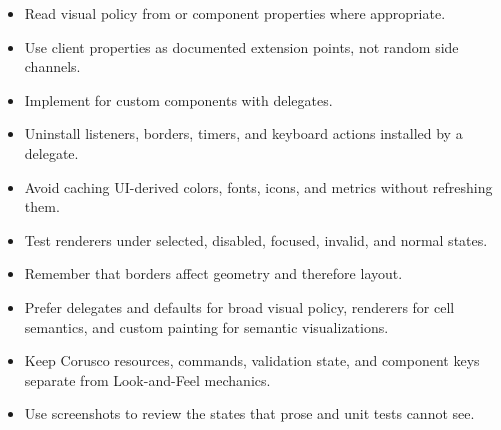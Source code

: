 \begin{itemize}
\item Read visual policy from  or component properties where appropriate.
\item Use client properties as documented extension points, not random side channels.
\item Implement  for custom components with delegates.
\item Uninstall listeners, borders, timers, and keyboard actions installed by a delegate.
\item Avoid caching UI-derived colors, fonts, icons, and metrics without refreshing them.
\item Test renderers under selected, disabled, focused, invalid, and normal states.
\item Remember that borders affect geometry and therefore layout.
\item Prefer delegates and defaults for broad visual policy, renderers for cell semantics, and custom painting for semantic visualizations.
\item Keep Corusco resources, commands, validation state, and component keys separate from Look-and-Feel mechanics.
\item Use screenshots to review the states that prose and unit tests cannot see.
\end{itemize}
